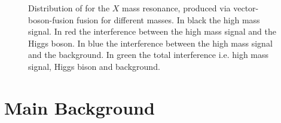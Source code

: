 \begin{figure}[htbp]
\centering
{}
\caption{Distribution of for the $X$ mass resonance, produced via vector-boson-fusion fusion for different masses. In black the high mass signal. In red the interference between the high mass signal and the Higgs boson. In blue the interference between the high mass signal and the background. In green the total interference i.e. high 
mass signal, Higgs bison and background.}
    \label{fig:Int_VBF_GEN}
\end{figure}


\section{Main Background}
